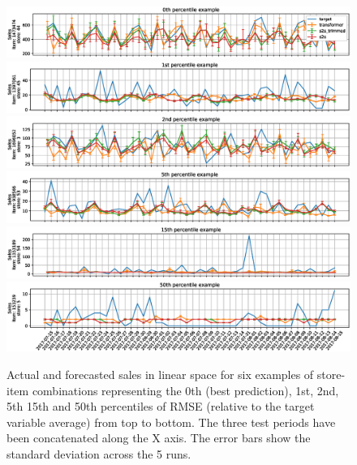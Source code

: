 \documentclass{elsarticle}
\begin{document}
	\begin{figure}
	\centering
	\includegraphics[width=1\linewidth]{img/sample_0_lin}
	\includegraphics[width=1\linewidth]{img/sample_1_lin}
	\includegraphics[width=1\linewidth]{img/sample_2_lin}
	\includegraphics[width=1\linewidth]{img/sample_3_lin}
	\includegraphics[width=1\linewidth]{img/sample_4_lin}
	\includegraphics[width=1\linewidth]{img/sample_5_lin}
	\caption{Actual and forecasted sales in linear space for six examples of store-item combinations representing the 0th (best prediction), 1st, 2nd, 5th 15th and 50th percentiles of RMSE (relative to the target variable average) from top to bottom. The three test periods have been concatenated along the X axis. The error bars show the standard deviation across the 5 runs.}
	\label{fig:ts_lin}
\end{figure}
	
\end{document}
